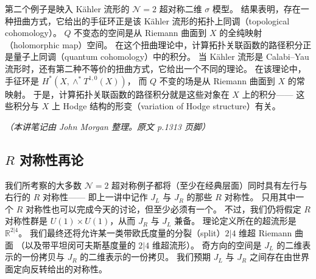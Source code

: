 第二个例子是映入 Kähler 流形的 $\mathcal{N}=2$ 超对称二维 $\sigma$ 模型。
结果表明，存在一种扭曲方式，它给出的手征环正是该 Kähler 流形的拓扑上同调（topological cohomology）。
$Q$ 不变态的空间是从 Riemann 曲面到 $X$ 的全纯映射（holomorphic map）空间。
在这个扭曲理论中，计算拓扑关联函数的路径积分正是量子上同调（quantum cohomology）中的积分。
当 Kähler 流形是 Calabi--Yau 流形时，还有第二种不等价的扭曲方式，它给出一个不同的理论。
在该理论中，手征环是 $H^*(X,\wedge^*T^{1,0}(X))$，
而 $Q$ 不变的场是从 Riemann 曲面到 $X$ 的常映射。
于是，计算拓扑关联函数的路径积分就是这些对象在 $X$ 上的积分——
这些积分与 $X$ 上 Hodge 结构的形变（variation of Hodge structure）有关。

\noindent\textit{（本讲笔记由 John Morgan 整理。原文 p.1313 页脚）}



\subsection{$R$ 对称性再论}

我们所考察的大多数 $\mathcal{N}=2$ 超对称例子都将（至少在经典层面）同时具有左行与右行的 $R$ 对称性——
即上一讲中记作 $J_L$ 与 $J_R$ 的那些 $R$ 对称性。
只用其中一个 $R$ 对称性也可以完成今天的讨论，但至少必须有一个。
不过，我们仍将假定 $R$ 对称性群是 $U(1)\times U(1)$，从而 $J_R$ 与 $J_L$ 兼备。
理论定义所在的超流形是 $\mathbb{R}^{2|4}$。
我们最终还将允许某一类带欧氏度量的分裂（split）$2|4$ 维超 Riemann 曲面
（以及带平坦闵可夫斯基度量的 $2|4$ 维超流形）。
奇方向的空间是 $J_L$ 的二维表示的一份拷贝与 $J_R$ 的二维表示的一份拷贝。
我们预期 $J_L$ 与 $J_R$ 之间存在由世界面定向反转给出的对称性。

